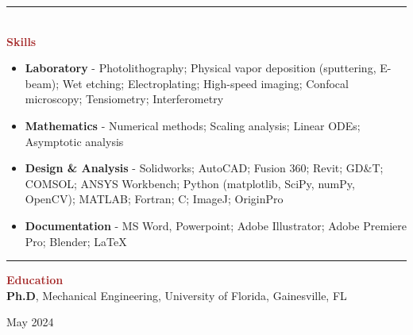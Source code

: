 \documentclass[11pt, letterpaper]{article}
\begin{document}
\vspace{-8pt}
\noindent \rule[2pt]{\textwidth}{0.5pt}
\\
\noindent \textbf{\large \textcolor{Brown}{Skills}}\vspace{-8pt}
\begin{multicols}{2}
\begin{itemize}[leftmargin=*]
\setlength\itemsep{-2pt}
\item \textbf{Laboratory} - Photolithography; Physical vapor deposition (sputtering, E-beam); Wet etching; Electroplating; High-speed imaging; Confocal microscopy; Tensiometry; Interferometry
\item \textbf{Mathematics} - Numerical methods; Scaling analysis; Linear ODEs; Asymptotic analysis
\item \textbf{Design \& Analysis} - Solidworks; AutoCAD; Fusion 360; Revit; GD\&T; COMSOL; ANSYS Workbench; Python (matplotlib, SciPy, numPy, OpenCV); MATLAB; Fortran; C; ImageJ; OriginPro
\item\textbf{Documentation} - MS Word, Powerpoint; Adobe Illustrator; Adobe Premiere Pro; Blender; \LaTeX
\end{itemize}
\end{multicols}
\vspace{-10pt}
\noindent \rule[2pt]{\textwidth}{0.5pt}
\noindent \textbf{\large \textcolor{Brown}{Education}}\vspace{2pt}\\
\textbf{Ph.D}, Mechanical Engineering, University of Florida, Gainesville, FL \hfill \raggedright{May 2024}\\
\end{document}
